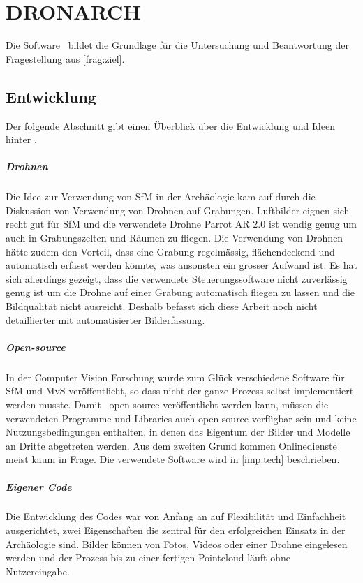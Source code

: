 \chapter{DRONARCH}
	Die Software \dronarch\ bildet die Grundlage für die Untersuchung und Beantwortung der Fragestellung aus \autoref{frag:ziel}.
	\section{Entwicklung}
		Der folgende Abschnitt gibt einen Überblick über die Entwicklung und Ideen hinter \dronarch. %
		
		\paragraph{Drohnen}
		Die Idee zur Verwendung von SfM in der Archäologie kam auf durch die Diskussion von Verwendung von Drohnen auf Grabungen. Luftbilder eignen sich recht gut für SfM  und die verwendete Drohne Parrot AR 2.0 ist wendig genug um auch in Grabungszelten und Räumen zu fliegen. Die Verwendung von Drohnen hätte zudem den Vorteil, dass eine Grabung regelmässig, flächendeckend und automatisch erfasst werden könnte, was ansonsten ein grosser Aufwand ist.
		Es hat sich allerdings gezeigt, dass die verwendete Steuerungssoftware nicht zuverlässig genug ist um die Drohne auf einer Grabung automatisch fliegen zu lassen und die Bildqualität nicht ausreicht.
		Deshalb befasst sich diese Arbeit noch nicht detaillierter mit automatisierter Bilderfassung.
		
		\paragraph{Open-source}
		In der Computer Vision Forschung wurde zum Glück verschiedene Software für SfM und MvS veröffentlicht, so dass nicht der ganze Prozess selbst implementiert werden musste.
		Damit \dronarch\ open-source veröffentlicht werden kann, müssen die verwendeten Programme und Libraries auch open-source verfügbar sein und keine Nutzungsbedingungen enthalten, in denen das Eigentum der Bilder und Modelle an Dritte abgetreten werden. Aus dem zweiten Grund kommen Onlinedienste meist kaum in Frage.
		Die verwendete Software wird in \autoref{imp:tech} beschrieben.
		
		\paragraph{Eigener Code}
		Die Entwicklung des Codes war von Anfang an auf Flexibilität und Einfachheit ausgerichtet, zwei Eigenschaften die zentral für den erfolgreichen Einsatz in der Archäologie sind.
		Bilder können von Fotos, Videos oder einer Drohne eingelesen werden und der Prozess bis zu einer fertigen Pointcloud läuft ohne Nutzereingabe.
		

